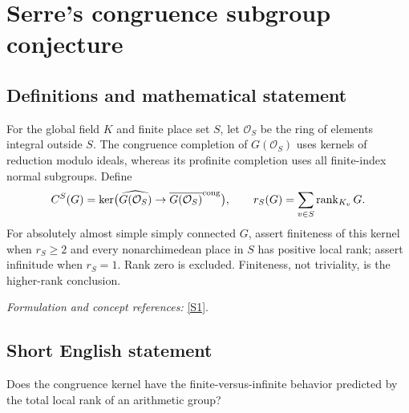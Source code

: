 \documentclass[11pt,a4paper]{article}
\newcommand{\sref}[2]{\hyperlink{source:#1:#2}{[S#2]}}
\newif\ifshowcatalogue
\newcommand{\cataloguescope}[1]{\ifshowcatalogue
 \paragraph{Exact scope in the supplied catalogue.}
 \begin{quote}\small #1\end{quote}\fi}
\numberwithin{equation}{section}
\begin{document}
\setcounter{section}{0}
\clearpage
\section*{\texorpdfstring{Serre's congruence subgroup conjecture}{Serre's congruence subgroup conjecture}}\label{statement}
\subsection{Definitions and mathematical statement}
For the global field $K$ and finite place set $S$, let $\mathcal O_S$ be the ring of elements integral outside $S$. The congruence completion of $G(\mathcal O_S)$ uses kernels of reduction modulo ideals, whereas its profinite completion uses all finite-index normal subgroups. Define
\[
 C^S(G)=\ker\bigl(\widehat{G(\mathcal O_S)}\to\overline{G(\mathcal O_S)}^{\rm cong}\bigr),
 \qquad r_S(G)=\sum_{v\in S}\operatorname{rank}_{K_v}G.
\]
For absolutely almost simple simply connected $G$, assert finiteness of this kernel when $r_S\ge2$ and every nonarchimedean place in $S$ has positive local rank; assert infinitude when $r_S=1$. Rank zero is excluded. Finiteness, not triviality, is the higher-rank conclusion.
\par\smallskip\textit{Formulation and concept references:} \sref{statement}{1}.
\cataloguescope{Let K be a global field (a number field or the function field of a curve over a finite field), G an absolutely almost simple simply connected algebraic K-group, and S a finite nonempty set of places of K containing every archimedean place when K is a number field. Put r\_S(G) = sum over v in S of rank\_\{K\_v\}(G), and let C\textasciicircum{}S(G) be the kernel of the natural surjection from the profinite completion of G(O\_S) (S-arithmetic topology) onto its S-congruence completion. Prove Serre's congruence subgroup conjecture: (a) if r\_S(G) >= 2 and rank\_\{K\_v\}(G) > 0 for every nonarchimedean v in S, then C\textasciicircum{}S(G) is finite; (b) if r\_S(G) = 1, then C\textasciicircum{}S(G) is infinite. The case r\_S(G) = 0 (finite G(O\_S), trivial kernel) is excluded. Finiteness of C\textasciicircum{}S(G) is the assertion; triviality is a stronger statement not required. Which specific groups remain unsettled is status information, not part of the target.}
\subsection{Short English statement}
Does the congruence kernel have the finite-versus-infinite behavior predicted by the total local rank of an arithmetic group?
\end{document}
